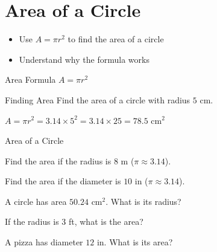 \section{Area of a Circle}

\begin{learningGoals}
\begin{itemize}
    \item Use $A = \pi r^2$ to find the area of a circle
    \item Understand why the formula works
\end{itemize}
\end{learningGoals}

\begin{conceptBox}{Area Formula}
$A = \pi r^2$
\end{conceptBox}

\begin{workedExample}{Finding Area}
Find the area of a circle with radius $5$ cm.

$A = \pi r^2 = 3.14 \times 5^2 = 3.14 \times 25 = 78.5$ cm$^2$
\end{workedExample}


\begin{practiceBox}{Area of a Circle}
\resetProblems

\prob Find the area if the radius is $8$ m ($\pi \approx 3.14$).

\prob Find the area if the diameter is $10$ in ($\pi \approx 3.14$).

\prob A circle has area $50.24$ cm$^2$. What is its radius?

\prob If the radius is $3$ ft, what is the area?

\prob A pizza has diameter $12$ in. What is its area?

\end{practiceBox}
